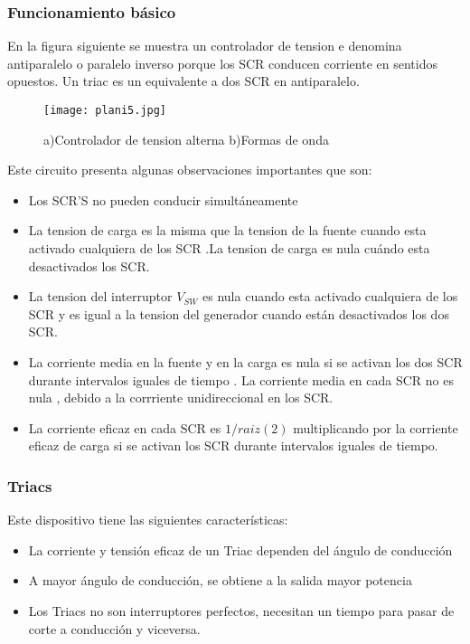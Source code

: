 \documentclass[Spanish,12pt,doublespace,german,letterpaper,dvipdfm]{article}
\begin{document}
\subsubsection{Funcionamiento básico}
En la figura siguiente se muestra un controlador de tension
e denomina antiparalelo o paralelo
inverso porque los SCR conducen corriente en sentidos opuestos. Un
triac es un equivalente a dos SCR en antiparalelo.\\
\begin{figure}[h!]
\begin{center}
 \texttt{[image: plani5.jpg]}
\end{center}
\caption{a)Controlador de tension alterna  b)Formas de onda}
\end{figure}
Este circuito presenta algunas observaciones importantes que son:
\begin{itemize}
  \item Los SCR'S no pueden conducir simultáneamente
  \item La tension de carga es la misma que la tension de la
  fuente cuando esta activado cualquiera de los SCR .La tension de
  carga es nula cuándo esta desactivados los SCR.
  \item La tension del interruptor  $V_{SW}$ es nula cuando esta
  activado cualquiera de los SCR y es igual a la tension del
  generador cuando están desactivados los dos SCR.
  \item La corriente media en la fuente y en la carga es nula si
  se activan los dos SCR durante intervalos iguales de tiempo . La
  corriente media en cada SCR no es nula , debido a la corrriente
  unidireccional en los SCR.
  \item La corriente eficaz en cada  SCR es $1/raiz(2)$
  multiplicando por la corriente eficaz de carga si se activan los
  SCR durante intervalos iguales de tiempo.
\end{itemize}


\subsubsection{Triacs}
Este dispositivo tiene las siguientes características:
\begin{itemize}
  \item     La corriente y tensión eficaz de un Triac dependen del ángulo de conducción
  \item     A mayor ángulo de conducción, se obtiene a la salida mayor potencia
  \item      Los Triacs no son interruptores perfectos,
   necesitan un tiempo para pasar de corte a conducción y viceversa.
\end{itemize}
\end{document}
